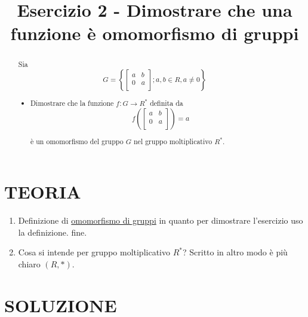 \documentclass[a4paper,10pt]{article}
\title{Esercizio 2 - Dimostrare che una funzione è omomorfismo di gruppi}
\author{}
\begin{document}
\maketitle

\begin{abstract}



Sia  
\[
  G = \left\{ \left[ {\begin{array}{cc}
   a & b \\
   0 & a \\    
   \end{array} } 
   \right] ; a, b \in R, a \ne 0 \right\} 
\]

\begin{itemize}
 \item Dimostrare che la funzione $f:G\longrightarrow R^{*}$ definita da \[
  f \left( \left[ {\begin{array}{cc}
   a & b \\
   0 & a \\    
   \end{array} } 
   \right] \right) = a
\]
 
è un omomorfismo del gruppo $G$ nel gruppo moltiplicativo $R^{*}$.



\end{itemize}

\end{abstract}

\section{TEORIA}

\begin{enumerate}
 \item Definizione di \href{./OmomorfismoGruppi.html}{omomorfismo di gruppi} in quanto per dimostrare l'esercizio uso la definizione. fine.
 \item Cosa si intende per gruppo moltiplicativo $R^{*}$? Scritto in altro modo è più chiaro $(R,*)$.

\end{enumerate}





\section{SOLUZIONE}
\end{document}
